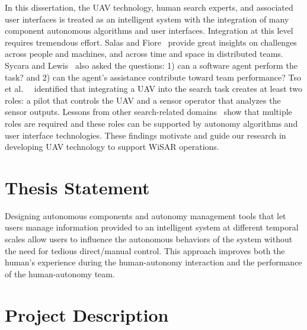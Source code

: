 In this dissertation, the UAV technology, human search experts, and associated user interfaces is treated as an intelligent system with the integration of many component autonomous algorithms and user interfaces. Integration at this level requires tremendous effort. Salas and Fiore~ provide great insights on challenges across people and machines, and across time and space in distributed teams. Sycara and Lewis~ also asked the questions: 1) can a software agent perform the task? and 2) can the agent's assistance contribute toward team performance? Tso et al.\ ~ identified that integrating a UAV into the search task creates at least two roles: a pilot that controls the UAV and a sensor operator that analyzes the sensor outputs. Lessons from other search-related domains~\cite{Drury2003Awareness} show that multiple roles are required and these roles can be supported by autonomy algorithms and user interface technologies. These findings motivate and guide our research in developing UAV technology to support WiSAR operations.

\section{Thesis Statement}
\label{thesis}

Designing autonomous components and autonomy management tools that let users manage information provided to an intelligent system at different temporal scales allow users to influence the autonomous behaviors of the system without the need for tedious direct/manual control. This approach improves both the human's experience during the human-autonomy interaction and the performance of the human-autonomy team.

\section{Project Description}
\label{project}

